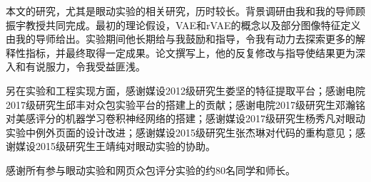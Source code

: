 \begin{thanks}

本文的研究，尤其是眼动实验的相关研究，历时较长。背景调研由我和我的导师顾振宇教授共同完成。最初的理论假设，VAE和rVAE的概念以及部分图像特征定义由我的导师给出。实验期间他长期给与我鼓励和指导，令我有动力去探索更多的解释性指标，并最终取得一定成果。论文撰写上，他的反复修改与指导使结果更为深入和有说服力，令我受益匪浅。

另在实验和工程实现方面，感谢媒设2012级研究生娄坚的特征提取平台；感谢电院2017级研究生邱丰对众包实验平台的搭建上的贡献；感谢电院2017级研究生邓瀚铭对美感评分的机器学习卷积神经网络的搭建；感谢媒设2017级研究生杨秀凡对眼动实验中例外页面的设计改进；感谢媒设2015级研究生张杰琳对代码的重构意见；感谢媒设2015级研究生王靖纯对眼动实验的协助。

感谢所有参与眼动实验和网页众包评分实验的约80名同学和师长。

\end{thanks}

